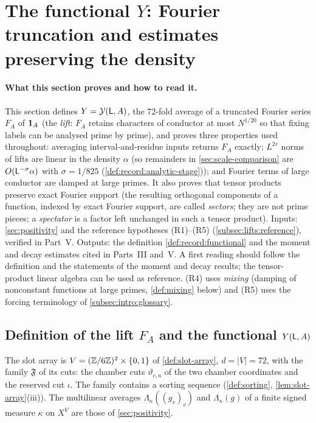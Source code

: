 \section{The functional \texorpdfstring{$Y$}{Y}: Fourier truncation and estimates preserving the density}
\label{sec:lifts}

\paragraph{What this section proves and how to read it.}
This section defines $Y=\mathcal Y(\mathsf L,A)$, the $72$-fold average of a
truncated Fourier series $F_A$ of $\mathbf 1_A$ (the \emph{lift}: $F_A$
retains characters of conductor at most $N^{1/20}$ so that fixing
labels can be analysed prime by prime), and proves three properties
used throughout: averaging interval-and-residue inputs returns $F_A$
exactly; $L^{2r}$ norms of lifts are linear in the density $\alpha$
(so remainders in \cref{sec:scale-comparison} are $O(\mathsf L^{-\sigma}
\alpha)$ with $\sigma=1/825$ (\cref{def:record:analytic-stage})); and Fourier terms of large conductor are damped at large
primes. It also proves that tensor products preserve exact Fourier
support (the resulting orthogonal components of a function,
indexed by exact Fourier support, are called \emph{sectors}; they
are not prime pieces; a \emph{spectator} is a factor left
unchanged in such a tensor product). Inputs: \cref{sec:positivity} and the reference hypotheses
(R1)--(R5) (\cref{subsec:lifts:reference}), verified in Part~V.
Outputs: the definition \cref{def:record:functional} and the moment
and decay estimates cited in Parts~III and~V. A first reading should
follow the definition and the statements of the moment and decay
results; the tensor-product linear algebra can be used as reference.
(R4) uses \emph{mixing} (damping of nonconstant functions
at large primes, \cref{def:mixing} below) and (R5) uses the forcing terminology
of \cref{subsec:intro:glossary}.

\subsection{Definition of the lift \texorpdfstring{$F_A$}{F\_A} and the functional \texorpdfstring{$Y(\mathsf L,A)$}{Y(L,A)}}\label{subsec:lifts:functional}

The slot array is $V=(\mathbb Z/6\mathbb Z)^2\times\{0,1\}$ of \cref{def:slot-array},
$d=|V|=72$, with the family $\mathfrak F$ of its cuts: the chamber cuts
$\vartheta_{c,a}$ of the two chamber coordinates and the reserved cut $\iota$.
The family contains a sorting sequence (\cref{def:sorting},
\cref{lem:slot-array}(iii)). The multilinear averages
$\Lambda_\kappa((g_v)_v)$ and $\Lambda_\kappa(g)$ of a finite signed measure
$\kappa$ on $X^V$ are those of \cref{sec:positivity}.

